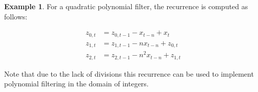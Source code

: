 \documentclass{article}
\theoremstyle{definition}
\newtheorem*{example}{Example}
\begin{document}
\begin{example}
For a quadratic polynomial filter, the recurrence is computed as follows:

\begin{align*}
z_{0,t} &= z_{0,t-1} - x_{t-n} + x_t \\
z_{1,t} &= z_{1,t-1} - n x_{t-n} + z_{0,t} \\
z_{2,t} &= z_{2,t-1} - n^2 x_{t-n} + z_{1,t}
\end{align*}

Note that due to the lack of divisions this recurrence can be used to implement polynomial filtering in the domain of integers.

\end{example}
\end{document}
